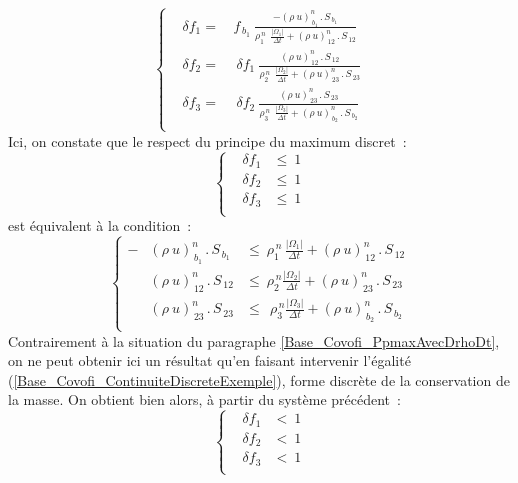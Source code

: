 \begin{equation}
\left\{\begin{array}{lll}
&\delta f_1 =& \,f_{\,b_1}\displaystyle\ \frac{- ( \rho\ u)^n_{\,b_1}\,.\,S_{\,b_1}}{\rho_1^{\,n}\ \displaystyle\ \frac{|\Omega_1|}{\Delta
t} + (\rho\ u)^n_{\,12}\,.\,S_{\,12}}\\
&\delta f_2 =&\ \,\delta f_1 \displaystyle\ \frac{(\rho\
u)^n_{\,12}\,.\,S_{\,12}}{\rho_2^{\,n}\ \displaystyle\ \frac{|\Omega_2|}{\Delta t} + (\rho\ u)^n_{\,23}\,.\,S_{\,23}}\\
&\delta f_3 =&\ \,\delta f_2 \displaystyle\ \frac{(\rho\
u)^n_{\,23}\,.\,S_{\,23}}{\rho_3^{\,n}\ \displaystyle\ \frac{|\Omega_3|}{\Delta
t} + (\rho\ u)^n_{\,b_2}\,.\,S_{\,b_2}}\\
\end{array}\right.
\end{equation}
Ici, on constate que le respect du principe du maximum discret~:\\
\begin{equation}
\left\{\begin{array}{lll}
&\delta f_1 &\leqslant \ 1 \\
&\delta f_2 &\leqslant \ 1 \\
&\delta f_3 &\leqslant \ 1 \\
\end{array}\right.
\end{equation}
est équivalent à la condition~:
\begin{equation}
\left\{\begin{array}{lll}
- &( \rho\ u)^n_{\,b_1}\,.\,S_{\,b_1}&\leqslant \displaystyle\ \rho_1^{\,n}
\,\frac{|\Omega_1|}{\Delta t} + (\rho\ u)^n_{\,12}\,.\,S_{\,12}\\
&(\rho\ u)^n_{\,12}\,.\,S_{\,12}&\leqslant \displaystyle\ \rho_2^{\,n}
\frac{|\Omega_2|}{\Delta t} + (\rho\ u)^n_{\,23}\,.\,S_{\,23}\\
& (\rho\ u)^n_{\,23}\,.\,S_{\,23}&\leqslant \ \displaystyle\ \rho_3^{\,n}
\frac{|\Omega_3|}{\Delta t} + (\rho\ u)^n_{\,b_2}\,.\,S_{\,b_2}\\
\end{array}\right.
\end{equation}
Contrairement à la situation du paragraphe
\ref{Base_Covofi_PpmaxAvecDrhoDt}, on ne peut obtenir ici un résultat qu'en
faisant intervenir l'égalité (\ref{Base_Covofi_ContinuiteDiscreteExemple}), forme
discrète de la conservation de la masse. On obtient bien alors, à partir du
système précédent~:
\begin{equation}
\left\{\begin{array}{lll}
&\delta f_1 &< \ 1 \\
&\delta f_2 &< \ 1 \\
&\delta f_3 &< \ 1 \\
\end{array}\right.
\end{equation}

